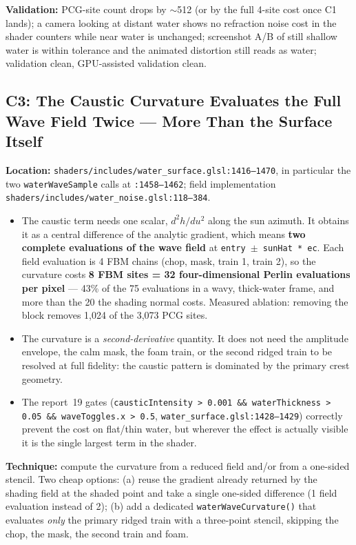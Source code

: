\documentclass[11pt,a4paper]{article}
\begin{document}
\begin{tcolorbox}[promptbox={Prompt: Make the Refraction Distortion Cheap, Band-Limited and Distance-Aware}]
\textbf{Validation:} PCG-site count drops by $\sim$512 (or by the full 4-site cost once C1 lands); a camera looking at
distant water shows no refraction noise cost in the shader counters while near water is unchanged; screenshot A/B of
still shallow water is within tolerance and the animated distortion still reads as water; validation clean, GPU-assisted
validation clean.
\end{tcolorbox}

\subsection{C3: The Caustic Curvature Evaluates the Full Wave Field Twice --- More Than the Surface Itself}

\textbf{Location:} \texttt{shaders/includes/water\_surface.glsl:1416--1470}, in particular the two
\texttt{waterWaveSample} calls at \texttt{:1458--1462}; field implementation
\texttt{shaders/includes/water\_noise.glsl:118--384}.

\begin{itemize}
    \item The caustic term needs one scalar, $d^2h/du^2$ along the sun azimuth. It obtains it as a central difference of
    the analytic gradient, which means \textbf{two complete evaluations of the wave field} at
    \texttt{entry $\pm$ sunHat * ec}. Each field evaluation is 4 FBM chains (chop, mask, train 1, train 2), so the
    curvature costs \textbf{8 FBM sites = 32 four-dimensional Perlin evaluations per pixel} --- 43\% of the 75 evaluations
    in a wavy, thick-water frame, and more than the 20 the shading normal costs. Measured ablation: removing the block
    removes 1,024 of the 3,073 PCG sites.
    \item The curvature is a \emph{second-derivative} quantity. It does not need the amplitude envelope, the calm mask,
    the foam train, or the second ridged train to be resolved at full fidelity: the caustic pattern is dominated by the
    primary crest geometry.
    \item The report~19 gates (\texttt{causticIntensity > 0.001 \&\& waterThickness > 0.05 \&\& waveToggles.x > 0.5},
    \texttt{water\_surface.glsl:1428--1429}) correctly prevent the cost on flat/thin water, but wherever the effect is
    actually visible it is the single largest term in the shader.
\end{itemize}

\textbf{Technique:} compute the curvature from a reduced field and/or from a one-sided stencil. Two cheap options:
(a) reuse the gradient already returned by the shading field at the shaded point and take a single one-sided difference
(1 field evaluation instead of 2); (b) add a dedicated \texttt{waterWaveCurvature()} that evaluates \emph{only} the
primary ridged train with a three-point stencil, skipping the chop, the mask, the second train and foam.
\end{document}
